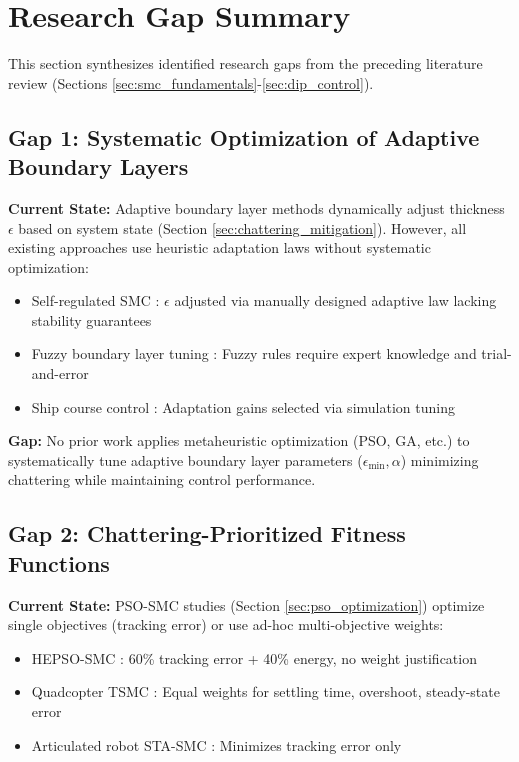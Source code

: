 \section{Research Gap Summary}
\label{sec:research_gap}

This section synthesizes identified research gaps from the preceding literature review (Sections \ref{sec:smc_fundamentals}-\ref{sec:dip_control}).

\subsection{Gap 1: Systematic Optimization of Adaptive Boundary Layers}

\textbf{Current State:} Adaptive boundary layer methods dynamically adjust thickness $\epsilon$ based on system state (Section \ref{sec:chattering_mitigation}). However, all existing approaches use heuristic adaptation laws without systematic optimization:
\begin{itemize}
\item Self-regulated SMC \cite{ieee2018selfreg}: $\epsilon$ adjusted via manually designed adaptive law lacking stability guarantees
\item Fuzzy boundary layer tuning \cite{fuzzy2023excavator}: Fuzzy rules require expert knowledge and trial-and-error
\item Ship course control \cite{ship2024adaptive}: Adaptation gains selected via simulation tuning
\end{itemize}

\textbf{Gap:} No prior work applies metaheuristic optimization (PSO, GA, etc.) to systematically tune adaptive boundary layer parameters ($\epsilon_{\min}, \alpha$) minimizing chattering while maintaining control performance.

\subsection{Gap 2: Chattering-Prioritized Fitness Functions}

\textbf{Current State:} PSO-SMC studies (Section \ref{sec:pso_optimization}) optimize single objectives (tracking error) or use ad-hoc multi-objective weights:
\begin{itemize}
\item HEPSO-SMC \cite{hepso2025manipulator}: 60\% tracking error + 40\% energy, no weight justification
\item Quadcopter TSMC \cite{mdpi2025quadcopter}: Equal weights for settling time, overshoot, steady-state error
\item Articulated robot STA-SMC \cite{ayinalem2025pso}: Minimizes tracking error only
\end{itemize}

